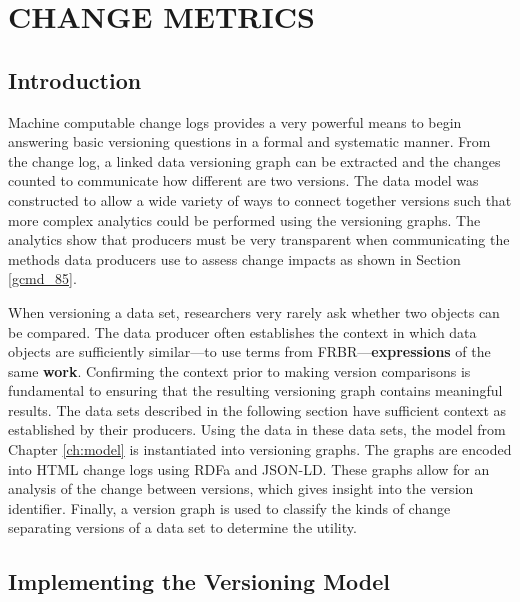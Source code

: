 
\chapter{CHANGE METRICS}\label{ch:graph}

\section{Introduction}

Machine computable change logs provides a very powerful means to begin answering basic versioning questions in a formal and systematic manner.
From the change log, a linked data versioning graph can be extracted and the changes counted to communicate how different are two versions.
The data model was constructed to allow a wide variety of ways to connect together versions such that more complex analytics could be performed using the versioning graphs.
The analytics show that producers must be very transparent when communicating the methods data producers use to assess change impacts as shown in Section \ref{gcmd_85}.

When versioning a data set, researchers very rarely ask whether two objects can be compared.
The data producer often establishes the context in which data objects are sufficiently similar---to use terms from FRBR---\textbf{expressions} of the same \textbf{work}.
Confirming the context prior to making version comparisons is fundamental to ensuring that the resulting versioning graph contains meaningful results.
The data sets described in the following section have sufficient context as established by their producers.
Using the data in these data sets, the model from Chapter \ref{ch:model} is instantiated into versioning graphs.
The graphs are encoded into HTML change logs using RDFa and JSON-LD.
These graphs allow for an analysis of the change between versions, which gives insight into the version identifier.
Finally, a version graph is used to classify the kinds of change separating versions of a data set to determine the utility.

\section{Implementing the Versioning Model}

